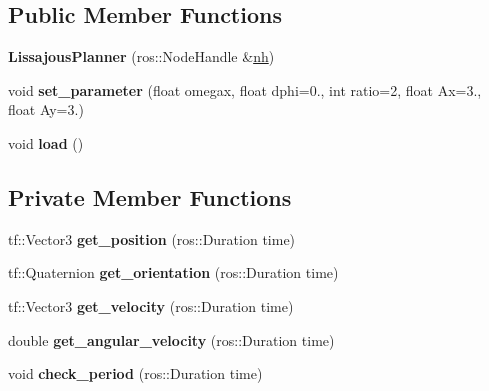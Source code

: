 \subsection*{Public Member Functions}
\begin{DoxyCompactItemize}
\item 
{\bfseries Lissajous\+Planner} (ros\+::\+Node\+Handle \&\hyperlink{classPlanner_a9714d036f444a07ce90be8d135b9a40c}{nh})\hypertarget{classLissajousPlanner_a82095ebb2cd29944a201321377fc78fe}{}\label{classLissajousPlanner_a82095ebb2cd29944a201321377fc78fe}

\item 
void {\bfseries set\+\_\+parameter} (float omegax, float dphi=0., int ratio=2, float Ax=3., float Ay=3.)\hypertarget{classLissajousPlanner_aa6e4d941a535dca182aaf8b73b5a0dcd}{}\label{classLissajousPlanner_aa6e4d941a535dca182aaf8b73b5a0dcd}

\item 
void {\bfseries load} ()\hypertarget{classLissajousPlanner_ae7ecff9989a37d29e591bac082b781ac}{}\label{classLissajousPlanner_ae7ecff9989a37d29e591bac082b781ac}

\end{DoxyCompactItemize}
\subsection*{Private Member Functions}
\begin{DoxyCompactItemize}
\item 
tf\+::\+Vector3 {\bfseries get\+\_\+position} (ros\+::\+Duration time)\hypertarget{classLissajousPlanner_aeb9a2e0f3cb8e651518bcd0dcd80bf2f}{}\label{classLissajousPlanner_aeb9a2e0f3cb8e651518bcd0dcd80bf2f}

\item 
tf\+::\+Quaternion {\bfseries get\+\_\+orientation} (ros\+::\+Duration time)\hypertarget{classLissajousPlanner_a07eb5dc306609dd6ae1f91e2738aee95}{}\label{classLissajousPlanner_a07eb5dc306609dd6ae1f91e2738aee95}

\item 
tf\+::\+Vector3 {\bfseries get\+\_\+velocity} (ros\+::\+Duration time)\hypertarget{classLissajousPlanner_a17a85db0fe0f380164297b8365232ab2}{}\label{classLissajousPlanner_a17a85db0fe0f380164297b8365232ab2}

\item 
double {\bfseries get\+\_\+angular\+\_\+velocity} (ros\+::\+Duration time)\hypertarget{classLissajousPlanner_ab7ef88484995f3fd223c8dcbd6f86a8e}{}\label{classLissajousPlanner_ab7ef88484995f3fd223c8dcbd6f86a8e}

\item 
void {\bfseries check\+\_\+period} (ros\+::\+Duration time)\hypertarget{classLissajousPlanner_a9001fcfa7f1d25e4ae7826499b0b2ebc}{}\label{classLissajousPlanner_a9001fcfa7f1d25e4ae7826499b0b2ebc}

\end{DoxyCompactItemize}
